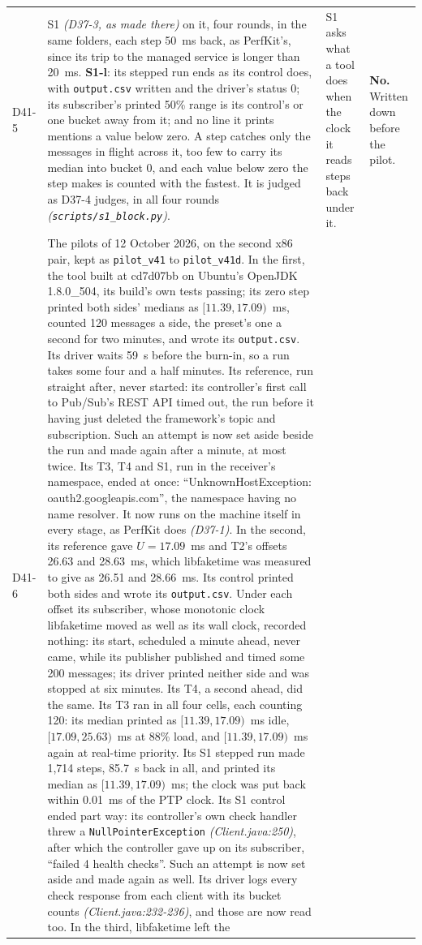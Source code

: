 \documentclass[11pt]{article}
\newcommand{\gl}[1]{{\color{soft}\itshape\small (#1)}}
\begin{document}
{\begin{longtable}{@{}p{1.1cm} >{\raggedright\arraybackslash}p{6.1cm} >{\raggedright\arraybackslash}p{6.0cm} >{\raggedright\arraybackslash}p{2.2cm}@{}}
D41-5 & S1 \gl{D37-3, as made there} on it, four rounds, in the same folders, each step 50~ms back, as PerfKit's, since its trip to the managed service is longer than 20~ms. \textbf{S1-l}: its stepped run ends as its control does, with \texttt{output.csv} written and the driver's status 0; its subscriber's printed 50\% range is its control's or one bucket away from it; and no line it prints mentions a value below zero. A step catches only the messages in flight across it, too few to carry its median into bucket 0, and each value below zero the step makes is counted with the fastest. It is judged as D37-4 judges, in all four rounds \gl{\texttt{scripts/s1\_block.py}}. & S1 asks what a tool does when the clock it reads steps back under it. & \textbf{No.} Written down before the pilot. \\
D41-6 & The pilots of 12 October 2026, on the second x86 pair, kept as \texttt{pilot\_v41} to \texttt{pilot\_v41d}. In the first, the tool built at cd7d07bb on Ubuntu's OpenJDK 1.8.0\_504, its build's own tests passing; its zero step printed both sides' medians as $[11.39, 17.09)$~ms, counted 120 messages a side, the preset's one a second for two minutes, and wrote its \texttt{output.csv}. Its driver waits 59~s before the burn-in, so a run takes some four and a half minutes. Its reference, run straight after, never started: its controller's first call to Pub/Sub's REST API timed out, the run before it having just deleted the framework's topic and subscription. Such an attempt is now set aside beside the run and made again after a minute, at most twice. Its T3, T4 and S1, run in the receiver's namespace, ended at once: ``UnknownHostException: oauth2.googleapis.com'', the namespace having no name resolver. It now runs on the machine itself in every stage, as PerfKit does \gl{D37-1}. In the second, its reference gave $U = 17.09$~ms and T2's offsets 26.63 and 28.63~ms, which libfaketime was measured to give as 26.51 and 28.66~ms. Its control printed both sides and wrote its \texttt{output.csv}. Under each offset its subscriber, whose monotonic clock libfaketime moved as well as its wall clock, recorded nothing: its start, scheduled a minute ahead, never came, while its publisher published and timed some 200 messages; its driver printed neither side and was stopped at six minutes. Its T4, a second ahead, did the same. Its T3 ran in all four cells, each counting 120: its median printed as $[11.39, 17.09)$~ms idle, $[17.09, 25.63)$~ms at 88\% load, and $[11.39, 17.09)$~ms again at real-time priority. Its S1 stepped run made 1,714 steps, 85.7~s back in all, and printed its median as $[11.39, 17.09)$~ms; the clock was put back within 0.01~ms of the PTP clock. Its S1 control ended part way: its controller's own check handler threw a \texttt{NullPointerException} \gl{Client.java:250}, after which the controller gave up on its subscriber, ``failed 4 health checks''. Such an attempt is now set aside and made again as well. Its driver logs every check response from each client with its bucket counts \gl{Client.java:232-236}, and those are now read too. In the third, libfaketime left the 
\end{longtable}}
\end{document}
